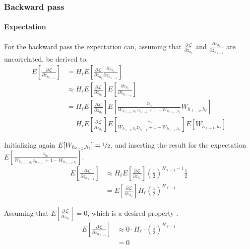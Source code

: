 \subsubsection{Backward pass}

\paragraph{Expectation} For the backward pass the expectation can, assuming that $\frac{\partial \mathcal{L}}{\partial z_{h_\ell}}$ and $\frac{\partial z_{h_\ell}}{\partial z_{h_{\ell-1}}}$ are uncorrelated, be derived to:
\begin{equation}
\begin{aligned}
E\left[\frac{\partial \mathcal{L}}{\partial z_{h_{\ell-1}}}\right]
&= H_\ell E\left[\frac{\partial \mathcal{L}}{\partial z_{h_\ell}} \frac{\partial z_{h_\ell}}{\partial z_{h_{\ell-1}}}\right] \\
&\approx H_\ell E\left[\frac{\partial \mathcal{L}}{\partial z_{h_\ell}}\right] E\left[\frac{\partial z_{h_\ell}}{\partial z_{h_{\ell-1}}}\right] \\
&= H_\ell E\left[\frac{\partial \mathcal{L}}{\partial z_{h_\ell}}\right] E\left[\frac{z_{h_\ell}}{W_{h_{\ell-1},h_\ell} z_{h_{\ell-1}} + 1 - W_{h_{\ell-1},h_\ell}} W_{h_{\ell-1},h_\ell}\right] \\
&= H_\ell E\left[\frac{\partial \mathcal{L}}{\partial z_{h_\ell}}\right] E\left[\frac{z_{h_\ell}}{W_{h_{\ell-1},h_\ell} z_{h_{\ell-1}} + 1 - W_{h_{\ell-1},h_\ell}}\right]E\left[W_{h_{\ell-1},h_\ell}\right]
\end{aligned}
\end{equation}

Initializing again $E[W_{h_{\ell-1},h_\ell}] = \nicefrac{1}{2}$, and inserting the result for the expectation $E\left[\frac{z_{h_\ell}}{W_{h_{\ell-1},h_\ell} z_{h_{\ell-1}} + 1 - W_{h_{\ell-1},h_\ell}}\right]$.
\begin{equation}
\begin{aligned}
E\left[\frac{\partial \mathcal{L}}{\partial z_{h_{\ell-1}}}\right] &\approx H_\ell E\left[\frac{\partial \mathcal{L}}{\partial z_{h_\ell}}\right] \left(\frac{1}{2}\right)^{H_{\ell-1}-1} \frac{1}{2} \\
&= E\left[\frac{\partial \mathcal{L}}{\partial z_{h_\ell}}\right] H_\ell \left(\frac{1}{2}\right)^{H_{\ell-1}}
\end{aligned}
\end{equation}

Assuming that $E\left[\frac{\partial \mathcal{L}}{\partial z_{h_\ell}}\right] = 0$, which is a desired property \cite{glorot-initialization}.
\begin{equation}
\begin{aligned}
E\left[\frac{\partial \mathcal{L}}{\partial z_{h_{\ell-1}}}\right] &\approx 0 \cdot H_\ell \cdot \left(\frac{1}{2}\right)^{H_{\ell-1}} \\
&= 0
\end{aligned}
\end{equation}


